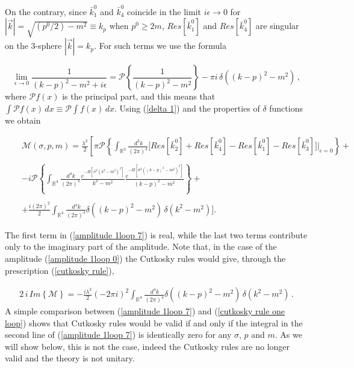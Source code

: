 \documentclass[a4paper,11pt]{article}
\newcommand{\be}{\begin{eqnarray}}
\newcommand{\ee}{\end{eqnarray}}
\newcommand{\bea}{\begin{eqnarray}}
\begin{document}
On the contrary, since $\bar{k}^0_1$ and $\bar{k}^0_4$ coincide in the limit $i\epsilon\rightarrow 0$ for \mbox{ $|\vec{k}|= \sqrt{\left(p^0/2\right)-m^2}\equiv k_p$} when $p^0 \geq 2 m$, $Res[\bar{k}^0_1]$ and $Res[\bar{k}^0_4]$ are singular on the 3-sphere $|\vec{k}|=k_p$. For such terms we use the formula



\begin{equation}\label{delta 1}
\lim_{\epsilon \rightarrow 0} \frac{ 1}{\left(k-p\right)^2 - m^2 + i
	\epsilon}  = \mathcal{P} \left\{ \frac{ 1}{\left(k-p\right)^2 - m^2 }\right\} -\pi i \,
\delta(\left(k-p\right)^2 - m^2) \, ,
\end{equation}
where $\mathcal{P} f(x)$ is the principal part, and this  means that $\int \mathcal{P}f(x) \, dx \equiv \mathcal{P}\int f(x) \, dx$.  Using (\ref{delta 1}) and the properties of $\delta$ functions we obtain


\bea\label{amplitude 1loop 7}
&& \mathcal{M}(\sigma,p,m)  =  \frac{ \lambda^2}{2}    \left[\pi \mathcal{P}\left\{ \int_{ \mathbb{R}^3} \frac{ \, d^3 k}{(2\pi)^4}  \Bigg[  Res[\bar{k}^0_2]+Res[\bar{k}^0_4]-Res[\bar{k}^0_1]-Res[\bar{k}^0_3]     \Bigg]{|}_{\epsilon= 0} \right\} +\right. \nonumber
\\ \nonumber
\\ 
&& - i \mathcal{P}\left\{\int_{ \mathbb{R}^4} \frac{ \, d^4 k}{(2\pi)^4}
\frac{e^{-H\left[\sigma^2\left(k^2-m^2\right)^2\right]}}{k^2 - m^2} \frac{e^{-H\left[\sigma^2\left(\left(k-p\right)^2-m^2\right)^2\right]}}{(k-p)^2 - m^2}\right\}
+ \nonumber\\ 
\\ 
&&
+  \frac{i \left(2\pi\right)^2}{2}    \int_{ \mathbb{R}^4} \frac{ \, d^4 k}{(2\pi)^4}  \delta\left( \left(k-p\right)^2 - m^2\right)\, \delta(k^2 - m^2) \Bigg] \nonumber .
\ee

The first term in (\ref{amplitude 1loop 7}) is real, while the last two terms contribute only to the imaginary part of the amplitude. 
Note that, in the case of the amplitude (\ref{amplitude 1loop 0}) the Cutkosky rules would give, through the prescription (\ref{cutkosky rule}),



\be\label{cutkosky rule one loop}
2 \, i \, \textit{Im}\left\{\mathcal{M}\right\} = -\frac{i \lambda^2}{2}\left(-2\pi i \right)^2   \int_{ \mathbb{R}^4} \frac{ \, d^4 k}{(2\pi)^4}  \delta\left( \left(k-p\right)^2 - m^2\right)\, \delta(k^2 - m^2) \, .
\ee
A simple comparison between (\ref{amplitude 1loop 7}) and (\ref{cutkosky rule one loop}) shows that Cutkosky rules would be  valid if and only if the integral in the second line of (\ref{amplitude 1loop 7}) is identically zero for any $\sigma$, $p$ and $m$. As we will show below, this  is not the case, indeed the Cutkosky rules are no longer valid and the theory is not unitary. 
\end{document}

